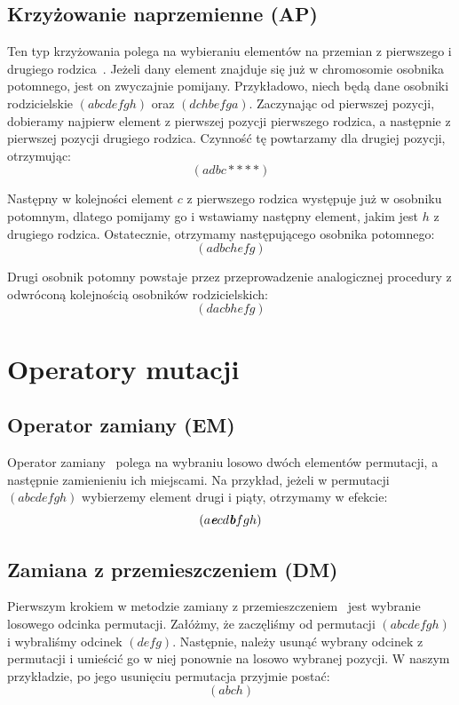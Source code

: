 \documentclass{xmgr}
\begin{document}
\subsection{Krzyżowanie naprzemienne (AP)}

Ten typ krzyżowania polega na wybieraniu elementów na przemian z pierwszego i drugiego rodzica~\cite{Larranaga99geneticalgorithms}. Jeżeli dany element znajduje się już w chromosomie osobnika potomnego, jest on zwyczajnie pomijany. Przykładowo, niech będą dane osobniki rodzicielskie $(a b c d e f g h)$ oraz $(d c h b e f g a)$. Zaczynając od pierwszej pozycji, dobieramy najpierw element z pierwszej pozycji pierwszego rodzica, a następnie z pierwszej pozycji drugiego rodzica. Czynność tę powtarzamy dla drugiej pozycji, otrzymując:
$$ (a d b c * * * *) $$

Następny w kolejności element $c$ z pierwszego rodzica występuje już w osobniku potomnym, dlatego pomijamy go i wstawiamy następny element, jakim jest $h$ z drugiego rodzica. Ostatecznie, otrzymamy następującego osobnika potomnego:
$$ (a d b c h e f g) $$

Drugi osobnik potomny powstaje przez przeprowadzenie analogicznej procedury z odwróconą kolejnością osobników rodzicielskich:
$$ (d a c b h e f g) $$


\section{Operatory mutacji}

\subsection{Operator zamiany (EM)}

Operator zamiany~\cite{Larranaga99geneticalgorithms} polega na wybraniu losowo dwóch elementów permutacji, a następnie zamienieniu ich miejscami. Na przykład, jeżeli w permutacji $ (a b c d e f g h) $ wybierzemy element drugi i piąty, otrzymamy w efekcie:
$$ (a \textit{\textbf{e}} c d \textit{\textbf{b}} f g h) $$

\subsection{Zamiana z przemieszczeniem (DM)}

Pierwszym krokiem w metodzie zamiany z przemieszczeniem~\cite{Michalewicz:2003:AGSDPE} jest wybranie losowego odcinka permutacji. Załóżmy, że zaczęliśmy od permutacji $ (a b c d e f g h) $ i wybraliśmy odcinek $ (d e f g) $. Następnie, należy usunąć wybrany odcinek z permutacji i umieścić go w niej ponownie na losowo wybranej pozycji. W naszym przykładzie, po jego usunięciu permutacja przyjmie postać:
$$ (a b c h) $$
\end{document}
